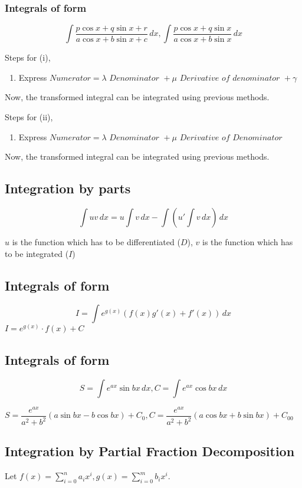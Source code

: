 \documentclass{article}
\begin{document}
\subsubsection{Integrals of form }
$$\int \dfrac{p\cos x + q \sin x +r}{a \cos x + b \sin x + c} \, dx , \int \dfrac{p \cos x + q \sin x }{a \cos x + b \sin x} \, dx $$

Steps for (i),
\begin{enumerate}[1.]
    \item Express $\textit{Numerator}= \lambda \textit{ Denominator } + \mu \textit{ Derivative of denominator } + \gamma$
\end{enumerate}
Now, the transformed integral can be integrated using previous methods.


Steps for (ii),
\begin{enumerate}[1.]
    \item Express $\textit{Numerator}=\lambda \textit{ Denominator } + \mu \textit{ Derivative of Denominator}$
\end{enumerate}
Now, the transformed integral can be integrated using previous methods.
\subsection{Integration by parts}

$$\int uv \, dx = u \int v \, dx - \int \left(u' \int v \, dx\right) \, dx$$


$u$ is the function which has to be differentiated ($D$), $v$ is the function which has to be integrated ($I$)

\subsection{Integrals of form }
$$I=\int e^{g(x)} \left(f(x)g'(x)+f'(x)\right) \, dx$$
$I=e^{g(x)} \cdot f(x) +C$

\subsection{Integrals of form }
$$S=\int e^{ax} \sin bx \, dx, C = \int e^{ax} \cos bx \, dx$$

$S=\dfrac{e^{ax}}{a^2+b^2}\left(a \sin bx -b \cos bx\right)+C_{0}, C=\dfrac{e^{ax}}{a^2+b^2}\left(a \cos bx + b \sin bx\right) + C_{00}$

\subsection{Integration by Partial Fraction Decomposition}
Let $f(x)=\displaystyle\sum_{i=0}^{n}a_{i}x^i, g(x)=\displaystyle\sum_{i=0}^{m} b_{i}x^i$.
\end{document}
